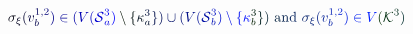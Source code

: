 \documentclass[12pt]{article}
\begin{document}
\makeatletter
\renewcommand*{\@textcolor}[3]{%
  \protect\leavevmode
  \begingroup
    \color#1{#2}#3%
  \endgroup
}
\makeatother
\begin{displaymath}
\mathcolor[RGB]{0,0,15}{\sigma} _ { \mathcolor[RGB]{0,0,30}{\xi} } \mathcolor[RGB]{0,0,45}{(} \mathcolor[RGB]{0,0,60}{v} _ { \mathcolor[RGB]{0,0,75}{b} } ^ { \mathcolor[RGB]{0,0,90}{1} \mathcolor[RGB]{0,0,105}{,} \mathcolor[RGB]{0,0,120}{2} } \mathcolor[RGB]{0,0,135}{)} \mathcolor[RGB]{0,0,150}{\in} \mathcolor[RGB]{0,0,165}{(} \mathcolor[RGB]{0,0,180}{V} \mathcolor[RGB]{0,0,195}{(} \mathcal { \mathcolor[RGB]{0,0,210}{S} } _ { \mathcolor[RGB]{0,0,225}{a} } ^ { \mathcolor[RGB]{0,0,240}{3} } \mathcolor[RGB]{0,0,255}{)} \mathcolor[RGB]{0,15,0}{\setminus} \mathcolor[RGB]{0,15,15}{\{} \mathcolor[RGB]{0,15,30}{\kappa} _ { \mathcolor[RGB]{0,15,45}{a} } ^ { \mathcolor[RGB]{0,15,60}{3} } \mathcolor[RGB]{0,15,75}{\}} \mathcolor[RGB]{0,15,90}{)} \mathcolor[RGB]{0,15,105}{\cup} \mathcolor[RGB]{0,15,120}{(} \mathcolor[RGB]{0,15,135}{V} \mathcolor[RGB]{0,15,150}{(} \mathcal { \mathcolor[RGB]{0,15,165}{S} } _ { \mathcolor[RGB]{0,15,180}{b} } ^ { \mathcolor[RGB]{0,15,195}{3} } \mathcolor[RGB]{0,15,210}{)} \mathcolor[RGB]{0,15,225}{\setminus} \mathcolor[RGB]{0,15,240}{\{} \mathcolor[RGB]{0,15,255}{\kappa} _ { \mathcolor[RGB]{0,30,0}{b} } ^ { \mathcolor[RGB]{0,30,15}{3} } \mathcolor[RGB]{0,30,30}{\}} \mathcolor[RGB]{0,30,45}{)} \mathrm { ~ \mathcolor[RGB]{0,30,60}{a} \mathcolor[RGB]{0,30,75}{n} \mathcolor[RGB]{0,30,90}{d} ~ } \mathcolor[RGB]{0,30,105}{\sigma} _ { \mathcolor[RGB]{0,30,120}{\xi} } \mathcolor[RGB]{0,30,135}{(} \mathcolor[RGB]{0,30,150}{v} _ { \mathcolor[RGB]{0,30,165}{b} } ^ { \mathcolor[RGB]{0,30,180}{1} \mathcolor[RGB]{0,30,195}{,} \mathcolor[RGB]{0,30,210}{2} } \mathcolor[RGB]{0,30,225}{)} \mathcolor[RGB]{0,30,240}{\in} \mathcolor[RGB]{0,30,255}{V} \mathcolor[RGB]{0,45,0}{(} \mathcal { \mathcolor[RGB]{0,45,15}{K} } ^ { \mathcolor[RGB]{0,45,30}{3} } \mathcolor[RGB]{0,45,45}{)}
\end{displaymath}
\end{document}
